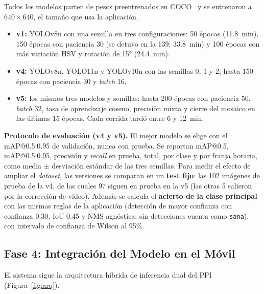 \documentclass[sensors,article,submit,pdftex,moreauthors]{Definitions/mdpi}
\begin{document}
Todos los modelos parten de pesos preentrenados en COCO~\cite{Jocher2023,Jocher2024,Wang2024v10} y se entrenaron a $640\times640$, el tamaño que usa la aplicación.
\begin{itemize}[leftmargin=*,labelsep=4.9mm]
\item \textbf{v1:} YOLOv8n con una semilla en tres configuraciones: 50 épocas (11.8~min), 150 épocas con paciencia 30 (se detuvo en la 139; 33.8~min) y 100 épocas con más variación HSV y rotación de 15° (24.4~min).
\item \textbf{v4:} YOLOv8n, YOLO11n y YOLOv10n con las semillas 0, 1 y 2; hasta 150 épocas con paciencia 30 y \emph{batch} 16.
\item \textbf{v5:} los mismos tres modelos y semillas; hasta 200 épocas con paciencia 50, \emph{batch} 32, tasa de aprendizaje coseno, precisión mixta y cierre del mosaico en las últimas 15 épocas. Cada corrida tardó entre 6 y 12~min.
\end{itemize}

\textbf{Protocolo de evaluación (v4 y v5).} El mejor modelo se elige con el mAP@0.5:0.95 de validación, nunca con prueba. Se reportan mAP@0.5, mAP@0.5:0.95, precisión y \emph{recall} en prueba, total, por clase y por franja horaria, como media $\pm$ desviación estándar de las tres semillas. Para medir el efecto de ampliar el \emph{dataset}, las versiones se comparan en un \textbf{test fijo}: las 102 imágenes de prueba de la v4, de las cuales 97 siguen en prueba en la v5 (las otras 5 salieron por la corrección de video). Además se calcula el \textbf{acierto de la clase principal} con las mismas reglas de la aplicación (detección de mayor confianza con confianza 0.30, IoU 0.45 y NMS agnóstica; sin detecciones cuenta como \texttt{sana}), con intervalo de confianza de Wilson al 95\%.

\subsection{Fase 4: Integración del Modelo en el Móvil}

El sistema sigue la arquitectura híbrida de inferencia dual del PPI (Figura~\ref{fig:arq}).
\end{document}
